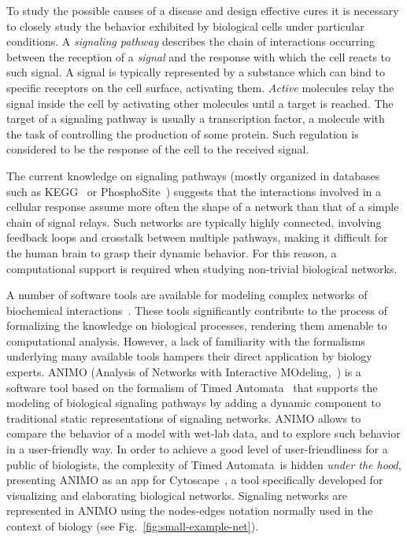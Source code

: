 \documentclass{llncs}
\newcommand{\tas}{Timed Automata}
\begin{document}
To study the possible causes of a disease and design effective cures it is 
necessary to closely study the behavior exhibited by biological cells under particular conditions.
A \emph{signaling pathway} describes the chain of interactions occurring
between the reception of a \emph{signal} and the response with which the cell
reacts to such signal. 
A signal is typically represented by a substance which can bind
to specific receptors on the cell surface, activating them.
\emph{Active} molecules relay the signal inside the cell by activating
other molecules until a target is reached. The target of a signaling pathway is usually a transcription
factor, a molecule with the task of controlling the production of some protein. Such regulation is considered to be the response of the cell to the received signal.

The current knowledge on signaling pathways (mostly organized in databases such as KEGG~\cite{kegg}
or PhosphoSite~\cite{phosphosite}) suggests that the interactions involved in a cellular response assume more often
the shape of a network than that of a simple chain of signal relays.
Such networks are typically highly connected, involving feedback loops and crosstalk
between multiple pathways, making it difficult for the human
brain to grasp their dynamic behavior.
For this reason, a computational support is required when studying non-trivial biological networks.

A number of software tools are available
for modeling complex networks of biochemical interactions~\cite{bio-pepa,blenx,copasi,e-cell,gna}.
These tools significantly contribute to the process of formalizing the knowledge on biological
processes, rendering them amenable to computational analysis.
However, a lack of familiarity with the formalisms underlying many available tools
hampers their direct application by biology experts.
ANIMO (Analysis of Networks with Interactive MOdeling,~\cite{animo-site,animo-ieee,animo-gene}) is a software tool
based on the formalism of \tas~\cite{timed-automata-alur} that supports the
modeling of biological signaling pathways
by adding a dynamic component to traditional static representations of signaling networks.
ANIMO allows to compare the behavior of
a model with wet-lab data, and to explore such behavior in a user-friendly way.
In order to achieve a good level of user-friendliness for a public of biologists, the complexity of \tas\ is hidden \emph{under the hood},
presenting ANIMO as an app for Cytoscape~\cite{cytoscape}, a tool specifically developed for visualizing 
and elaborating biological networks. Signaling networks are represented in ANIMO using
the nodes-edges notation normally used in the context of biology (see Fig.~\ref{fig:small-example-net}).
\end{document}
